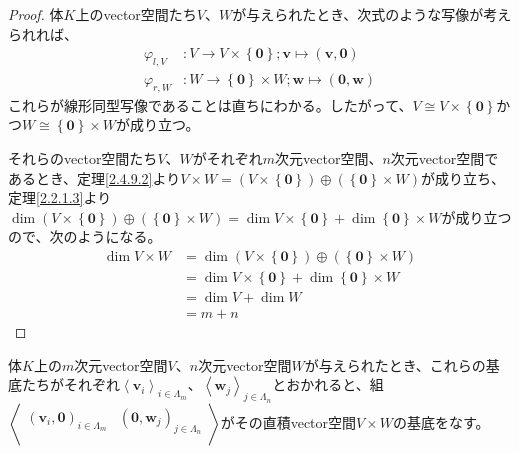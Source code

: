 \documentclass[dvipdfmx]{jsarticle}
\begin{document}
\begin{proof}
体$K$上のvector空間たち$V$、$W$が与えられたとき、次式のような写像が考えられれば、
\begin{align*}
\varphi_{l,V}&:V \rightarrow V \times \left\{ \mathbf{0} \right\};\mathbf{v} \mapsto \left( \mathbf{v},\mathbf{0} \right)\\
\varphi_{r,W}&:W \rightarrow \left\{ \mathbf{0} \right\} \times W;\mathbf{w} \mapsto \left( \mathbf{0},\mathbf{w} \right)
\end{align*}
これらが線形同型写像であることは直ちにわかる。したがって、$V \cong V \times \left\{ \mathbf{0} \right\}$かつ$W \cong \left\{ \mathbf{0} \right\} \times W$が成り立つ。\par
それらのvector空間たち$V$、$W$がそれぞれ$m$次元vector空間、$n$次元vector空間であるとき、定理\ref{2.4.9.2}より$V \times W = \left( V \times \left\{ \mathbf{0} \right\} \right) \oplus \left( \left\{ \mathbf{0} \right\} \times W \right)$が成り立ち、定理\ref{2.2.1.3}より$\dim{\left( V \times \left\{ \mathbf{0} \right\} \right) \oplus \left( \left\{ \mathbf{0} \right\} \times W \right)} = \dim{V \times \left\{ \mathbf{0} \right\}} + \dim{\left\{ \mathbf{0} \right\} \times W}$が成り立つので、次のようになる。
\begin{align*}
\dim{V \times W} &= \dim{\left( V \times \left\{ \mathbf{0} \right\} \right) \oplus \left( \left\{ \mathbf{0} \right\} \times W \right)}\\
&= \dim{V \times \left\{ \mathbf{0} \right\}} + \dim{\left\{ \mathbf{0} \right\} \times W}\\
&= \dim V + \dim W\\
&= m + n
\end{align*}
\end{proof}
\begin{thm}\label{2.4.9.4}
体$K$上の$m$次元vector空間$V$、$n$次元vector空間$W$が与えられたとき、これらの基底たちがそれぞれ$\left\langle \mathbf{v}_{i} \right\rangle_{i \in \varLambda_{m}}$、$\left\langle \mathbf{w}_{j} \right\rangle_{j \in \varLambda_{n}}$とおかれると、組$\left\langle \begin{matrix}
\left( \mathbf{v}_{i},\mathbf{0} \right)_{i \in \varLambda_{m}} & \left( \mathbf{0},\mathbf{w}_{j} \right)_{j \in \varLambda_{n}} \\
\end{matrix} \right\rangle$がその直積vector空間$V \times W$の基底をなす。
\end{thm}
\end{document}
